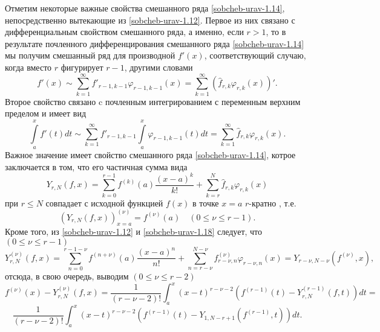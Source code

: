 Отметим некоторые важные свойства смешанного ряда \eqref{sobcheb-urav-1.14}, непосредственно вытекающие из \eqref{sobcheb-urav-1.12}. Первое из них связано с дифференциальным свойством смешанного ряда, а именно, если $r>1$, то в результате почленного дифференцирования смешанного ряда \eqref{sobcheb-urav-1.14} мы получим смешанный ряд для производной $f'(x)$, соответствующий случаю, когда вместо $r$ фигурирует $r-1$, другими словами
\begin{equation}\label{sobcheb-urav-1.16}
f'(x)\sim  \sum_{k=1}^\infty f'_{r-1,k-1}\varphi_{r-1,k-1}(x)=\sum_{k=1}^\infty (\hat f_{r,k}\varphi_{r,k}(x))'.
\end{equation}
Второе свойство связано c почленным интегрированием с переменным верхним пределом и имеет вид
\begin{equation}\label{sobcheb-urav-1.17}
\int\limits_a^xf'(t)dt\sim \sum_{k=1}^\infty f'_{r-1,k-1}\int\limits_a^x\varphi_{r-1,k-1}(t)dt=\sum_{k=1}^\infty \hat f_{r,k}\varphi_{r,k}(x).
\end{equation}
Важное значение имеет свойство  смешанного ряда \eqref{sobcheb-urav-1.14}, котрое заключается в том, что его частичная сумма вида
\begin{equation}\label{sobcheb-urav-1.18}
Y_{r,N}(f,x)=\sum_{k=0}^{r-1} f^{(k)}(a)\frac{(x-a)^k}{k!}+ \sum_{k=r}^{N} \hat f_{r,k}\varphi_{r,k}(x)
\end{equation}
 при   $r\le N$  совпадает с исходной функцией $f(x)$   в точке $x=a$ $r$-кратно , т.е.
\begin{equation}\label{sobcheb-urav-1.19}
(Y_{r,N}(f,x))^{(\nu)}_{x=a}=f^{(\nu)}(a)\quad (0\le\nu\le r-1).
\end{equation}
Кроме того, из \eqref{sobcheb-urav-1.12} и \eqref{sobcheb-urav-1.18} следует, что $(0\le\nu\le r-1)$
\begin{equation}\label{sobcheb-urav-1.20}
 Y_{r,N}^{(\nu)}(f,x)=\sum_{n=0}^{r-1-\nu} f^{(n+\nu)}(a)\frac{(x-a)^n}{n!}+ \sum_{n=r-\nu}^{N-\nu} f_{r-\nu,n}^{(\nu)}\varphi_{r-\nu,n}(x)=Y_{r-\nu,N-\nu}(f^{(\nu)},x),
 \end{equation}
отсюда, в свою очередь, выводим $(0\le\nu\le r-2)$
 $$
f^{(\nu)}(x)-Y_{r,N}^{(\nu)}(f,x)= \frac{1}{(r-\nu-2)!}\int_a^x (x-t)^{r-\nu-2}(f^{(r-1)}(t)-Y_{r,N}^{(r-1)}(f,t))dt=
$$
  \begin{equation}\label{sobcheb-urav-1.21}
\frac{1}{(r-\nu-2)!}\int_a^x (x-t)^{r-\nu-2}(f^{(r-1)}(t)-Y_{1,N-r+1}(f^{(r-1)},t))dt.
 \end{equation}


